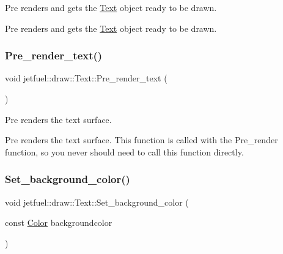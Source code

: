 Pre renders and gets the \hyperlink{classjetfuel_1_1draw_1_1Text}{Text} object ready to be drawn. 

Pre renders and gets the \hyperlink{classjetfuel_1_1draw_1_1Text}{Text} object ready to be drawn. \mbox{\label{classjetfuel_1_1draw_1_1Text_a5ce2072f87c6e02dfbc363e1c489cc3b}} 
\subsubsection{\texorpdfstring{Pre\+\_\+render\+\_\+text()}{Pre\_render\_text()}}
{\footnotesize\ttfamily void jetfuel\+::draw\+::\+Text\+::\+Pre\+\_\+render\+\_\+text (\begin{DoxyParamCaption}{ }\end{DoxyParamCaption})\hspace{0.3cm}{\ttfamily [protected]}}



Pre renders the text surface. 

Pre renders the text surface. This function is called with the Pre\+\_\+render function, so you never should need to call this function directly. \mbox{\label{classjetfuel_1_1draw_1_1Text_af1eaae041e0f763a95ca6e87aa7c3d7e}} 
\subsubsection{\texorpdfstring{Set\+\_\+background\+\_\+color()}{Set\_background\_color()}}
{\footnotesize\ttfamily void jetfuel\+::draw\+::\+Text\+::\+Set\+\_\+background\+\_\+color (\begin{DoxyParamCaption}\item[{const \hyperlink{classjetfuel_1_1draw_1_1Color}{Color}}]{backgroundcolor }\end{DoxyParamCaption})\hspace{0.3cm}{\ttfamily [inline]}}



